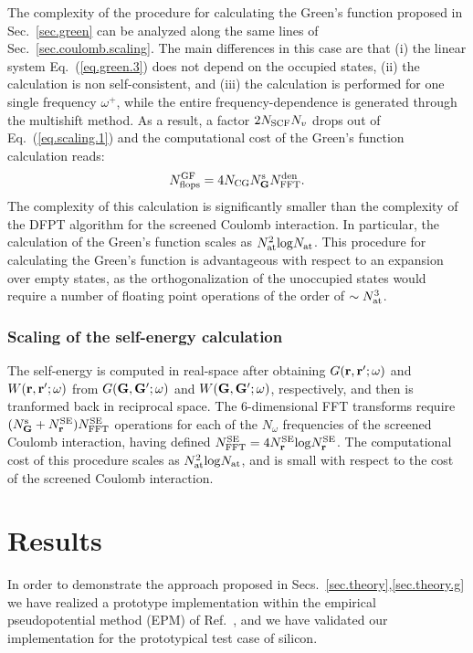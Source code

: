 \documentclass[twocolumn,prb,showpacs,superscriptaddress]{revtex4}
\def\w{\omega}
\def\G{{\bf G}}
\def\Gp{{\bf G^\prime}}
\def\r{{\bf r}}
\def\rp{{\bf r^\prime}}
\begin{document}
The complexity of the procedure for calculating the Green's function proposed
in Sec.\ \ref{sec.green} can be analyzed along the same
lines of Sec.\ \ref{sec.coulomb.scaling}. The main differences in this case are that (i) the linear system
Eq.\ (\ref{eq.green.3}) does not depend on the occupied states,
(ii) the calculation is non self-consistent, and (iii) the calculation is performed
for one single frequency $\w^+$, while the entire frequency-dependence is generated
through the multishift method. As a result, a factor $2 N_{\rm SCF} N_v$ drops out
of Eq.\ (\ref{eq.scaling.1}) and the computational cost of the Green's function
calculation reads:
   \begin{equation}\label{eq.scaling.3}
   N^{\rm GF}_{\rm flops} = 4 N_{\rm CG} N_\G^{\rm s} N^{\rm den}_{\rm FFT}.
   \end{equation}
The complexity of this calculation is significantly smaller than the complexity
of the DFPT algorithm for the screened Coulomb interaction. In particular, the
calculation of the Green's function scales as $N_{\rm at}^2 {\rm log} N_{\rm at}$.
This procedure for calculating the Green's function is advantageous
with respect to an expansion over empty states, as the orthogonalization
of the unoccupied states would require a number of floating point operations 
of the order of $\sim N_{\rm at}^3$.

\subsubsection{Scaling of the self-energy calculation}\label{sec.sigma.scaling}

The self-energy is computed in real-space after obtaining $G(\r,\rp;\w)$ and $W(\r,\rp;\w)$ 
from $G(\G,\Gp;\w)$ and $W(\G,\Gp;\w)$, respectively, and then is tranformed back in reciprocal space.
The 6-dimensional FFT transforms require $(N_\G^{\rm s}+N_\r^{\rm SE})N^{\rm SE}_{\rm FFT}$
operations for each of the $N_\w$ frequencies of the screened Coulomb interaction,
having defined $N^{\rm SE}_{\rm FFT}=4 N_\r^{\rm SE} {\rm log} N_\r^{\rm SE}$.
The computational cost of this procedure scales as $N_{\rm at}^2 {\rm log} N_{\rm at}$,
and is small with respect to the cost of the screened
Coulomb interaction.

\section{Results}\label{sec.results}

In order to demonstrate the approach proposed in Secs.~\ref{sec.theory},\ref{sec.theory.g}  we have realized a prototype implementation
within the empirical pseudopotential method (EPM) of Ref.\ ,
and we have validated our implementation for the prototypical test case of silicon.
\end{document}
